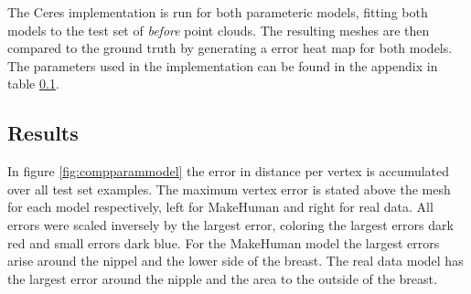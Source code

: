 The Ceres implementation is run for both parameteric models, fitting both models to the test set of \textit{before} point clouds. The resulting meshes are then compared to the ground truth by generating a error heat map for both models. The parameters used in the implementation can be found in the appendix in table \ref{}. %

\subsection{Results}
In figure \ref{fig:compparammodel} the error in distance per vertex is accumulated over all test set examples. The maximum vertex error is stated above the mesh for each model respectively, left for MakeHuman and right for real data. All errors were scaled inversely by the largest error, coloring the largest errors dark red and small errors dark blue. For the MakeHuman model the largest errors arise around the nippel and the lower side of the breast. The real data model has the largest error around the nipple and the area to the outside of the breast.

